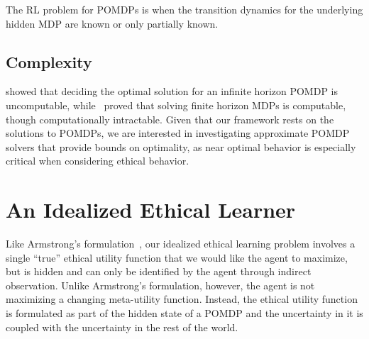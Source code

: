 \documentclass[11pt]{article}
\newcommand\davenote[1]{\textcolor{blue}{Dave: #1}}
\begin{document}
The RL problem for POMDPs is when the transition dynamics for the underlying hidden MDP are known or only partially known.

\subsection{Complexity}

\cite{madani1999undecidability} showed that deciding the optimal solution for an infinite horizon POMDP is uncomputable, while~\cite{mundhenk2000complexity} proved that solving finite horizon MDPs is computable, though computationally intractable. Given that our framework rests on the solutions to POMDPs, we are interested in investigating approximate POMDP solvers that provide bounds on optimality, as near optimal behavior is especially critical when considering ethical behavior.



\section{An Idealized Ethical Learner}
Like Armstrong's formulation~, our idealized ethical learning problem involves a single ``true'' ethical utility function that we would like the agent to maximize, but is hidden and can only be identified by the agent through indirect observation. Unlike Armstrong's formulation, however, the agent is not maximizing a changing meta-utility function. Instead, the ethical utility function is formulated as part of the hidden state of a POMDP and the uncertainty in it is coupled with the uncertainty in the rest of the world.
\end{document}
